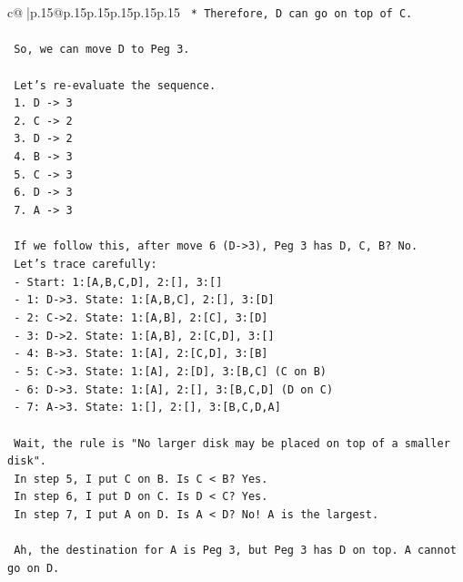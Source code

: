 \documentclass{article}
\begin{document}
{\begin{supertabular}{c@{$\;$}|p{.15\linewidth}@{}p{.15\linewidth}p{.15\linewidth}p{.15\linewidth}p{.15\linewidth}p{.15\linewidth}}
{{{\texttt{        *   Therefore, D can go on top of C.} \\
\\ 
\texttt{    So, we can move D to Peg 3.} \\
\\ 
\texttt{    Let's re{-}evaluate the sequence.} \\
\texttt{    1. D {-}> 3} \\
\texttt{    2. C {-}> 2} \\
\texttt{    3. D {-}> 2} \\
\texttt{    4. B {-}> 3} \\
\texttt{    5. C {-}> 3} \\
\texttt{    6. D {-}> 3} \\
\texttt{    7. A {-}> 3} \\
\\ 
\texttt{    If we follow this, after move 6 (D{-}>3), Peg 3 has D, C, B? No.} \\
\texttt{    Let's trace carefully:} \\
\texttt{    {-} Start: 1:{[}A,B,C,D{]}, 2:{[}{]}, 3:{[}{]}} \\
\texttt{    {-} 1: D{-}>3. State: 1:{[}A,B,C{]}, 2:{[}{]}, 3:{[}D{]}} \\
\texttt{    {-} 2: C{-}>2. State: 1:{[}A,B{]}, 2:{[}C{]}, 3:{[}D{]}} \\
\texttt{    {-} 3: D{-}>2. State: 1:{[}A,B{]}, 2:{[}C,D{]}, 3:{[}{]}} \\
\texttt{    {-} 4: B{-}>3. State: 1:{[}A{]}, 2:{[}C,D{]}, 3:{[}B{]}} \\
\texttt{    {-} 5: C{-}>3. State: 1:{[}A{]}, 2:{[}D{]}, 3:{[}B,C{]} (C on B)} \\
\texttt{    {-} 6: D{-}>3. State: 1:{[}A{]}, 2:{[}{]}, 3:{[}B,C,D{]} (D on C)} \\
\texttt{    {-} 7: A{-}>3. State: 1:{[}{]}, 2:{[}{]}, 3:{[}B,C,D,A{]}} \\
\\ 
\texttt{    Wait, the rule is "No larger disk may be placed on top of a smaller disk".} \\
\texttt{    In step 5, I put C on B. Is C < B? Yes.} \\
\texttt{    In step 6, I put D on C. Is D < C? Yes.} \\
\texttt{    In step 7, I put A on D. Is A < D? No! A is the largest.} \\
\\ 
\texttt{    Ah, the destination for A is Peg 3, but Peg 3 has D on top. A cannot go on D.} \\
}}}
\end{supertabular}}
\end{document}
